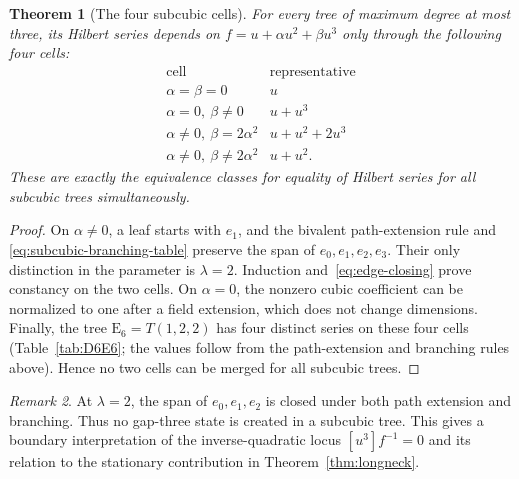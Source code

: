 \documentclass[reqno]{article}
\theoremstyle{plain} %
\newtheorem{theorem}{Theorem}[section]
\theoremstyle{definition}
\theoremstyle{remark}
\newtheorem{remark}[theorem]{\sc Remark}
\numberwithin{equation}{section}
\begin{document}
\begin{theorem}[The four subcubic cells]\label{thm:subcubic-strata}
For every tree of maximum degree at most three, its Hilbert series depends
on $f=u+\alpha u^2+\beta u^3$ only through the following four cells:
\begin{equation}\label{eq:four-subcubic-cells}
\begin{array}{c|l}
\text{cell}&\text{representative}\\\hline
\alpha=\beta=0&u\\
\alpha=0,\ \beta\ne0&u+u^3\\
\alpha\ne0,\ \beta=2\alpha^2&u+u^2+2u^3\\
\alpha\ne0,\ \beta\ne2\alpha^2&u+u^2.
\end{array}
\end{equation}
These are exactly the equivalence classes for equality of Hilbert series
for all subcubic trees simultaneously.
\end{theorem}
\begin{proof}
On $\alpha\ne0$, a leaf starts with $e_1$, and the bivalent path-extension rule and
\eqref{eq:subcubic-branching-table} preserve the span of $e_0,e_1,e_2,e_3$.
Their only distinction in the parameter is $\lambda=2$.
Induction and~\eqref{eq:edge-closing} prove constancy on the two cells.
On $\alpha=0$, the nonzero cubic coefficient can be normalized to one
after a field extension, which does not change dimensions.
Finally, the tree $\mathrm E_6=T(1,2,2)$ has four distinct series on these four
cells (Table~\ref{tab:D6E6}; the values follow from the path-extension and
branching rules above). Hence no two cells can be merged for all
subcubic trees.
\end{proof}

\begin{remark}
At $\lambda=2$, the span of $e_0,e_1,e_2$ is closed under both path extension
and branching. Thus no gap-three state is created in a subcubic tree.
This gives a boundary interpretation of the inverse-quadratic locus
$[u^3]f^{-1}=0$ and its relation to the stationary contribution in
Theorem~\ref{thm:longneck}.
\end{remark}
\end{document}
